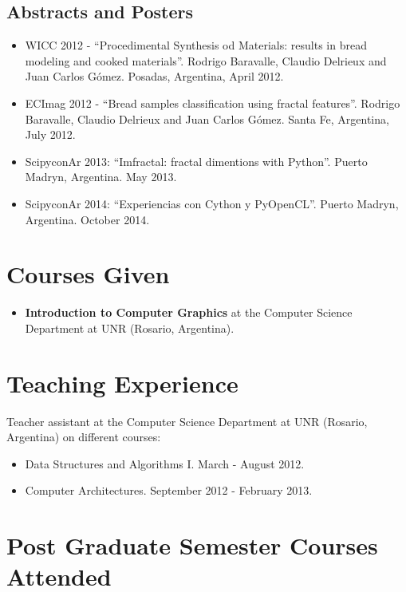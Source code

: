 \documentclass[a4paper,12pt]{article}
\begin{document}
\subsection*{Abstracts and Posters}
\begin{itemize}
\item WICC 2012 - \textquotedblleft Procedimental Synthesis od Materials: results in bread modeling and cooked materials\textquotedblright. Rodrigo Baravalle, Claudio Delrieux and Juan Carlos G\'omez. Posadas, Argentina, April 2012.
\item ECImag 2012 - \textquotedblleft Bread samples classification using fractal features\textquotedblright. Rodrigo Baravalle, Claudio Delrieux and Juan Carlos G\'omez. Santa Fe, Argentina, July 2012.
\item ScipyconAr 2013: \textquotedblleft Imfractal: fractal dimentions with Python\textquotedblright. Puerto Madryn, Argentina. May 2013.
\item ScipyconAr 2014: \textquotedblleft Experiencias con Cython y PyOpenCL\textquotedblright. Puerto Madryn, Argentina. October 2014.
\end{itemize}


\section*{Courses Given}
\begin{itemize}
\item {\bf Introduction to Computer Graphics} at the Computer Science Department at UNR (Rosario, Argentina).
\end{itemize}

\section*{Teaching Experience}

Teacher assistant at the Computer Science Department at UNR (Rosario, Argentina) on different courses:
\begin{itemize}
\item Data Structures and Algorithms I. March - August 2012.
\item Computer Architectures. September 2012 - February 2013.
\end{itemize}


\section*{Post Graduate Semester Courses Attended}
\end{document}

